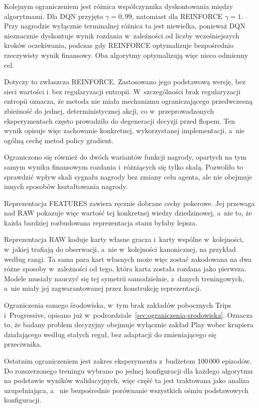 Kolejnym ograniczeniem jest różnica współczynnika dyskontowania między
algorytmami. Dla DQN przyjęto $\gamma=0{,}99$, natomiast dla REINFORCE
$\gamma=1$. Przy nagrodzie wyłącznie terminalnej różnica ta jest niewielka,
ponieważ DQN nieznacznie dyskontuje wynik rozdania w~zależności od liczby
wcześniejszych kroków oczekiwania, podczas gdy REINFORCE optymalizuje
bezpośrednio rzeczywisty wynik finansowy. Oba algorytmy optymalizują więc
nieco odmienny cel.

Dotyczy to zwłaszcza REINFORCE. Zastosowano jego podstawową wersję,
bez sieci wartości i~bez regularyzacji entropii. W~szczególności brak
regularyzacji entropii oznacza, że metoda nie miała mechanizmu
ograniczającego przedwczesną zbieżność do jednej, deterministycznej
akcji, co w~przeprowadzonych eksperymentach często prowadziło do degeneracji
decyzji przed flopem. Ten wynik opisuje więc zachowanie konkretnej,
wykorzystanej implementacji, a~nie ogólną cechę metod
policy gradient.

Ograniczono się również do dwóch wariantów funkcji nagrody, opartych
na tym samym wyniku finansowym rozdania i~różniących się tylko skalą.
Pozwoliło to sprawdzić wpływ skali sygnału nagrody bez zmiany celu
agenta, ale nie obejmuje innych sposobów kształtowania nagrody.

Reprezentacja FEATURES zawiera ręcznie dobrane cechy pokerowe. Jej
przewaga nad RAW pokazuje więc wartość tej konkretnej wiedzy
dziedzinowej, a~nie to, że każda bardziej rozbudowana reprezentacja
stanu byłaby lepsza.

Reprezentacja RAW koduje karty własne gracza i~karty wspólne w~kolejności,
w~jakiej trafiają do obserwacji, a~nie w~kolejności kanonicznej, na przykład
według rangi. Ta sama para kart własnych może więc zostać zakodowana na dwa
różne sposoby w~zależności od tego, która karta została rozdana jako
pierwsza. Modele musiały nauczyć się tej symetrii samodzielnie, z~danych
treningowych, a~nie miały jej zagwarantowanej przez konstrukcję
reprezentacji.

Ograniczenia samego środowiska, w~tym brak zakładów pobocznych Trips
i~Progressive, opisano już w~podrozdziale~\ref{sec:ograniczenia-srodowiska}.
Oznacza to, że badany problem decyzyjny obejmuje
wyłącznie zakład Play wobec krupiera działającego według stałych
reguł, bez adaptacji do zmieniającego się przeciwnika.

Ostatnim ograniczeniem jest zakres eksperymentu z~budżetem
100\,000 epizodów. Do rozszerzonego treningu wybrano po jednej
konfiguracji dla każdego algorytmu na podstawie wyników
walidacyjnych, więc część ta jest traktowana jako analiza uzupełniająca, a~
nie bezpośrednie porównanie wszystkich ośmiu podstawowych
konfiguracji.


